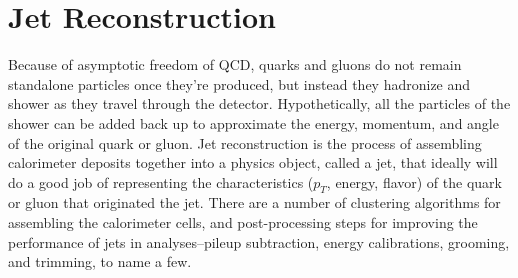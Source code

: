 %



\section{Jet Reconstruction}
\label{sec:jet_reco}
Because of asymptotic freedom of QCD, quarks and gluons do not remain standalone particles once they're produced, 
but instead they hadronize and shower as they travel through the detector.  Hypothetically, all the particles of 
the shower can be added back up to approximate the energy, momentum, and angle of the original quark 
or gluon.  Jet reconstruction is the process of assembling calorimeter deposits together into a physics object, called a 
jet, that ideally will do a good job of representing the characteristics ($p_T$, energy, 
flavor) of the quark or gluon that originated the jet.  There are a number of clustering algorithms for 
assembling the calorimeter cells, and post-processing steps for improving the performance of jets in analyses--pileup 
subtraction, energy calibrations, grooming, and trimming, to name a few.  

